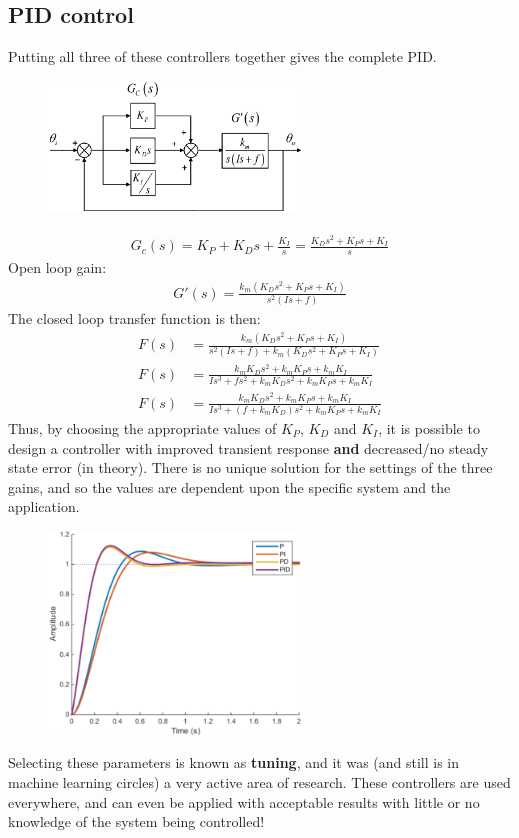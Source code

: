 \documentclass[class=report, crop=false, 12pt,a4paper]{standalone}
\begin{document}
\subsection{PID control}
Putting all three of these controllers together gives the complete PID.
\begin{figure}[H]
  \centerline{\includegraphics[width = 0.6\textwidth]{../img/diagram131.png}}
  \caption{}
\end{figure}
\begin{align}
  G_c (s) = K_P + K_D s + \frac{K_I}{s} = \frac{K_D s^2 + K_P s + K_I}{s}
\end{align}
Open loop gain:
\begin{align}
  G'(s) = \frac{k_m \left( K_D s^2 + K_P s + K_I \right)}{s^2 \left( Is + f \right)}
\end{align}
The closed loop transfer function is then:
\begin{align}
  F(s) &= \frac{k_m \left(K_D s^2 + K_P s + K_I\right)}{s^2 \left( Is + f\right) + k_m \left(K_D s^2 + K_P s +K_I \right)}\\
  F(s) &= \frac{k_m K_D s^2 + k_m K_P s + k_m K_I}{Is^3 + fs^2 + k_m K_D s^2 + k_m K_P s + k_m K_I}\\
  F(s) &= \frac{k_m K_D s^2 + k_m K_P s + k_m K_I}{Is^3 + \left( f +k_m K_D\right) s^2 + k_m K_P s + k_m K_I}
\end{align}
Thus, by choosing the appropriate values of $K_P$, $K_D$ and $K_I$, it is possible to design a controller with improved transient response \textbf{and} decreased/no steady state error (in theory). There is no unique solution for the settings of the three gains, and so the values are dependent upon the specific system and the application.
\begin{figure}[H]
  \centerline{\includegraphics[width = 0.6\textwidth]{../img/diagram132.png}}
  \caption{}
\end{figure}
Selecting these parameters is known as \textbf{tuning}, and it was (and still is in machine learning circles) a very active area of research. These controllers are used everywhere, and can even be applied with acceptable results with little or no knowledge of the system being controlled!
\end{document}
